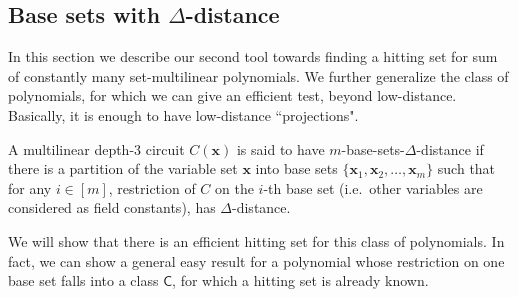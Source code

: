 \documentclass[final,oneeqnum, onethmnum, onefignum]{siamltex1213}
\newcommand{\di}{\Delta} %
\newcommand{\lis}[3]{{#1}_1 #2 {#1}_2 #2\dots #2 {#1}_{#3}}
\begin{document}
\subsection{Base sets with $\di$-distance}
\label{sec:baseSets}
In this section we describe our second tool towards finding
a hitting set for sum of constantly many set-multilinear polynomials.
We further generalize the class 
of polynomials, for which we can give an efficient test, 
beyond low-distance. 
Basically, it is enough to have low-distance ``projections". 

\begin{definition}
A multilinear depth-$3$ circuit $C(\mathbf{x})$ is said to have 
$m$-base-sets-$\di$-distance
if there is a partition of the 
variable set $\mathbf{x}$
into base sets $\{\lis{\mathbf{x}}{,}{m}\}$ such that 
for any $i \in [m]$, 
restriction of $C$ on the $i$-{th} base set 
(i.e.\ other variables are considered as field constants), 
 has $\di$-distance. 
\end{definition}

We will show that there is an efficient hitting set for this class of polynomials.
In fact, we can show a general easy result for a polynomial whose
restriction on one base set falls into a class $\mathsf{C}$,
for which a hitting set is already known. 
\end{document}
